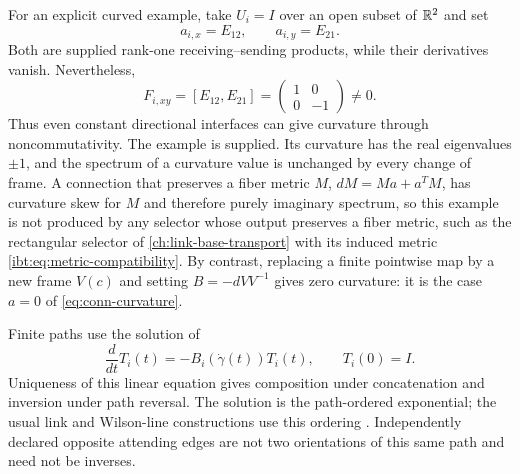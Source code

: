 For an explicit curved example, take $U_i=I$ over an open subset of $\mathbb R^2$ and set
\begin{equation}
a_{i,x}=E_{12},\qquad a_{i,y}=E_{21}.
\end{equation}
Both are supplied rank-one receiving--sending products, while their derivatives vanish. Nevertheless,
\begin{equation}
F_{i,xy}=[E_{12},E_{21}]
=\begin{pmatrix}1&0\\0&-1\end{pmatrix}\ne0.
\end{equation}
Thus even constant directional interfaces can give curvature through noncommutativity. The example is supplied. Its curvature has the real eigenvalues $\pm1$, and the spectrum of a curvature value is unchanged by every change of frame. A connection that preserves a fiber metric $M$, $dM=Ma+a^TM$, has curvature skew for $M$ and therefore purely imaginary spectrum, so this example is not produced by any selector whose output preserves a fiber metric, such as the rectangular selector of \cref{ch:link-base-transport} with its induced metric \cref{ibt:eq:metric-compatibility}. By contrast, replacing a finite pointwise map by a new frame $V(c)$ and setting $B=-dV V^{-1}$ gives zero curvature: it is the case $a=0$ of \cref{eq:conn-curvature}.

Finite paths use the solution of
\begin{equation}
\frac{d}{dt}T_i(t)=-B_i(\dot\gamma(t))T_i(t),\qquad T_i(0)=I.
\end{equation}
Uniqueness of this linear equation gives composition under concatenation and inversion under path reversal. The solution is the path-ordered exponential; the usual link and Wilson-line constructions use this ordering \citep{Tong2018}. Independently declared opposite attending edges are not two orientations of this same path and need not be inverses.

